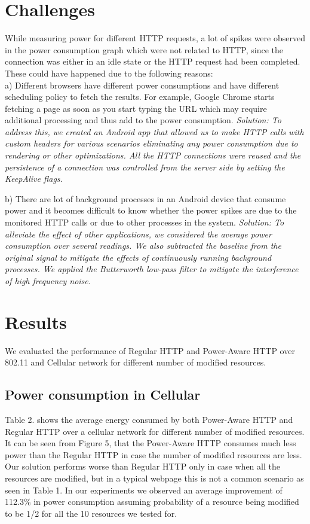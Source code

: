 \documentclass{sigplanconf}
\begin{document}
\section{ Challenges}

While measuring power for different HTTP requests, a lot of spikes were observed in the power consumption graph which were not related to HTTP, since the connection was either in an idle state or the HTTP request had been completed. These could have happened due to the following reasons: \\
a) Different browsers have different power consumptions and have different scheduling policy to fetch the results. For example, Google Chrome starts fetching a page as soon as you start typing the URL which may require additional processing and thus add to the power consumption.
\it{Solution:} \rm To address this, we created an Android app that allowed us to make HTTP calls with custom headers for various scenarios eliminating any power consumption due to rendering or other optimizations. All the HTTP connections were reused and the persistence of a connection was controlled from the server side by setting the KeepAlive flags.

b) There are lot of background processes in an Android device that consume power and it becomes difficult to know whether the power spikes are due to the monitored HTTP calls or due to other processes in the system.
\it{Solution:} \rm To alleviate the effect of other applications, we considered the average power consumption over several readings. We also subtracted the baseline from the original signal to mitigate the effects of continuously running background processes. We applied the Butterworth low-pass filter to mitigate the interference of high frequency noise.


\section{Results}
We evaluated the performance of Regular HTTP and Power-Aware HTTP over 802.11 and Cellular network for different number of modified resources.  

\subsection{Power consumption in Cellular}
Table 2. shows the average energy consumed by both Power-Aware HTTP and Regular HTTP over a cellular network for different number of modified resources. It can be seen from Figure 5, that the Power-Aware HTTP consumes much less power than the Regular HTTP in case the number of modified resources are less. Our solution performs worse than Regular HTTP only in case when all the resources are modified, but in a typical webpage this is not a common scenario as seen in Table 1. In our experiments we observed an average improvement of 112.3\% in power consumption assuming probability of a resource being modified to be 1/2 for all the 10 resources we tested for.
\end{document}
